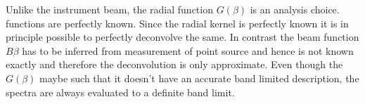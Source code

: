 Unlike the instrument beam, the radial function $G(\beta)$ is an analysis choice. functions are perfectly known. Since the radial kernel is perfectly known it is in principle possible to perfectly deconvolve the same. In contrast the beam function $B{\beta}$ has to be inferred from measurement of point source and hence is not known exactly and therefore the deconvolution is only approximate.
Even though the $G(\beta)$ maybe such that it doesn't have an accurate band limited  description, the spectra are always evaluated to a definite band limit.  
